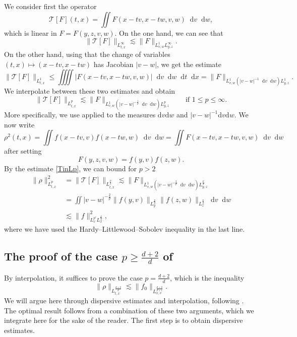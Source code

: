 \documentclass[11pt,a4paper,reqno]{amsart}
\theoremstyle{plain}
\theoremstyle{remark}
\newcommand{\dd}{\mathop{}\!\mathrm{d}}
\begin{document}
We  consider first the operator
\begin{equation}
    \label{eq.defT}
    \mathcal{T}[F](t,x) = \iint F(x-tv,x-tw,v,w) \dd v \dd w,
\end{equation}
which is linear in $F = F(y,z,v,w)$. On the one hand, we can see that
\[
    \| \mathcal{T}[F] \|_{L^\infty_{t,x}} \lesssim \| F \|_{L^1_{v,w} L^\infty_{y,z}}.
\]
On the other hand, using that the change of variables $(t,x) \mapsto (x-tv,x-tw)$ has Jacobian $|v-w|$, we get the estimate
\[
\| 
    \mathcal{T}[F] \|_{L^1_{t,x}} \leq \iiiint |F(x-tv,x-tw,v,w)| \dd v \dd w \dd t \dd x = \| F \|_{L^1_{v,w}(|v-w|^{-1} \dd v \dd w) L^1_{y,z}}.
\]
We interpolate between these two estimates and obtain 
\begin{equation}\label{TinLp}
    \|\mathcal{T}[F] \|_{L^p_{t,x}} \lesssim \| F \|_{L^1_{v,w}(|v-w|^{-\frac{ 1}{p}} \dd v \dd w) L^p_{y,z}} \qquad \text{if }1 \leq p \leq \infty.
\end{equation}
More specifically, we use \cite[Theorem 5.4.1]{BerghLofstrom} applied to the measures $\mathrm{d}v\mathrm{d}w$  and $|v-w|^{-1}\mathrm{d}v\mathrm{d}w$.
We now write
\[
    \rho^2(t,x) = \iint f(x-tv,v) f(x-tw,w) \dd v \dd w = \iint F(x-tv,x-tw,v,w) \dd v \dd w
\]
after setting
\[
    F(y,z,v,w) = f(y,v) f(z,w).
\]
By the estimate \eqref{TinLp}, we can bound for $p>2$
\begin{align*}
    \| \rho \|_{L^p_{t,x}}^2 & = \| \mathcal{T}[F] \|_{L^{\frac p2}_{t,x}} \lesssim \| F \|_{L^1_{v,w}(|v-w|^{-\frac 2p} \dd v \dd w) L^{\frac p2}_{y,z}} \\
    & = \iint |v-w|^{-\frac 2 p} \| f(y,v) \|_{L^{\frac p2}_y} \| f(z,w) \|_{L^{\frac p2}_z} \dd v \dd w \\
    & \lesssim \| f \|_{L^{p'}_v L^{\frac p2}_x}^2,
\end{align*}
where we have used the Hardy--Littlewood--Sobolev inequality in the last line. 

\subsection{The proof of the case \texorpdfstring{$p \geq \frac{d+2}{d}$}{p >= (d+2)/d} of } By interpolation, it suffices to prove the case $p=\frac{d+2}{d}$, which is the inequality
\[
    \| \rho \|_{L^{\frac{d+2}{d}}_{t,x}} \lesssim \| f_0 \|_{L^{\frac{d+2}{d+1}}_{x,v}}.
\]
We will argue here through dispersive estimates and interpolation, following \cite{CastellaPerthame1996,keelTao1998}. The optimal result follows from a combination of these two arguments, which we integrate here for the sake of the reader. The first step is to obtain dispersive estimates.
\end{document}
